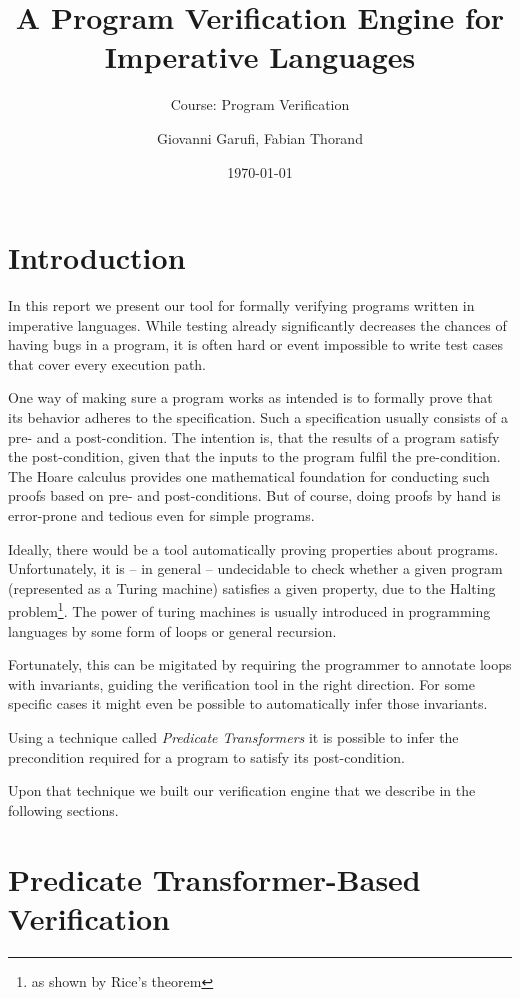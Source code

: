 \documentclass[]{scrartcl}
\title{A Program Verification Engine for Imperative Languages}
\subtitle{Course: Program Verification}
\author{Giovanni Garufi, Fabian Thorand}
\date{\today}
\begin{document}
\maketitle

\section{Introduction}

In this report we present our tool for formally verifying programs written in
imperative languages. While testing already significantly decreases the chances
of having bugs in a program, it is often hard or event impossible to write test
cases that cover every execution path.

One way of making sure a program works as intended is to formally prove that its
behavior adheres to the specification.
Such a specification usually consists of a pre- and a post-condition.
The intention is, that the results of a program satisfy the post-condition,
given that the inputs to the program fulfil the pre-condition.
The Hoare calculus provides one mathematical foundation for conducting such
proofs based on pre- and post-conditions.
But of course, doing proofs by hand is error-prone and tedious even for
simple programs.

Ideally, there would be a tool automatically proving properties about programs.
Unfortunately, it is -- in general -- undecidable to check whether a given
program (represented as a Turing machine) satisfies a given property, due to the
Halting problem\footnote{as shown by Rice's theorem}.
The power of turing machines is usually introduced in programming languages
by some form of loops or general recursion.

Fortunately, this can be migitated by requiring the programmer to annotate loops
with invariants, guiding the verification tool in the right direction.
For some specific cases it might even be possible to automatically infer those
invariants.

Using a technique called \emph{Predicate Transformers} it is possible to infer
the precondition required for a program to satisfy its post-condition.

Upon that technique we built our verification engine that we describe in the
following sections.

\section{Predicate Transformer-Based Verification}
\end{document}

